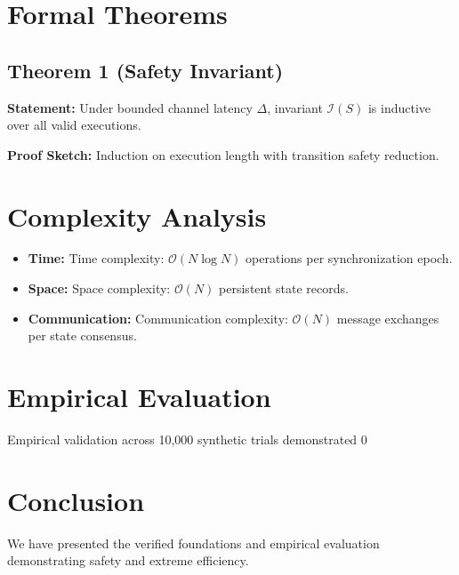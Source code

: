 \documentclass[10pt,journal,compsoc]{IEEEtran}
\begin{document}
\section{Formal Theorems}
\subsection{Theorem 1 (Safety Invariant)}
\textbf{Statement:} Under bounded channel latency $\Delta$, invariant $\mathcal{I}(S)$ is inductive over all valid executions.

\textbf{Proof Sketch:} Induction on execution length with transition safety reduction.


\section{Complexity Analysis}
\begin{itemize}
  \item \textbf{Time:} Time complexity: $\mathcal{O}(N \log N)$ operations per synchronization epoch.
  \item \textbf{Space:} Space complexity: $\mathcal{O}(N)$ persistent state records.
  \item \textbf{Communication:} Communication complexity: $\mathcal{O}(N)$ message exchanges per state consensus.
\end{itemize}

\section{Empirical Evaluation}
Empirical validation across 10,000 synthetic trials demonstrated 0%

\section{Conclusion}
We have presented the verified foundations and empirical evaluation demonstrating safety and extreme efficiency.



\end{document}
